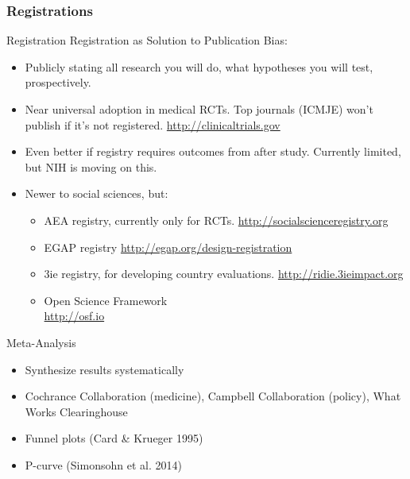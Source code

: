 \documentclass{beamer}
\begin{document}
\subsubsection*{Registrations}
\begin{frame}{Registration}
Registration as Solution to Publication Bias:
 \begin{itemize}
  \item
   Publicly stating all research you will do, what hypotheses you will test, prospectively.
  \item
   Near universal adoption in medical RCTs. Top journals (ICMJE) won't publish if it's not registered. \url{http://clinicaltrials.gov}
  \item
   Even better if registry requires outcomes from after study. Currently limited, but NIH is moving on this.
   \item Newer to social sciences, but:
   \begin{itemize}[<.->]
   \item
   	AEA registry, currently only for RCTs. \url{http://socialscienceregistry.org}
   \item
    EGAP registry \url{http://egap.org/design-registration}
   \item 
    3ie registry, for developing country evaluations. \url{http://ridie.3ieimpact.org}
   \item
   	Open Science Framework\\ \url{http://osf.io}
   \end{itemize}
  \end{itemize}  
\end{frame}


\begin{frame}{Meta-Analysis}
\begin{itemize}
\item Synthesize results systematically
\item Cochrance Collaboration (medicine), Campbell Collaboration (policy), What Works Clearinghouse
\item Funnel plots (Card \& Krueger 1995)
\item P-curve (Simonsohn et al. 2014)
\end{itemize}
\end{frame}
\end{document}
